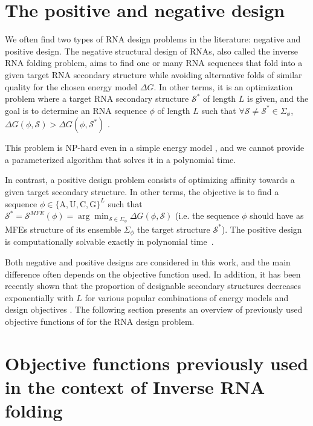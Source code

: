 \section{The positive and negative design}

We often find two types of \ac{RNA} design problems in the literature: negative and positive design. The negative structural design of \acp{RNA}, also called the inverse \ac{RNA} folding problem, aims to find one or many \ac{RNA} sequences that fold into a given target \ac{RNA} secondary structure while avoiding alternative folds of similar quality for the chosen energy model $\Delta G$. In other terms, it is an optimization problem where a target \ac{RNA} secondary structure $\mathcal{S}^*$ of length $L$ is given, and the goal is to determine an \ac{RNA} sequence $\phi$ of length $L$ such that $\forall \mathcal{S} \neq \mathcal{S}^* \in \Sigma_{\phi}$, $\Delta G(\phi, \mathcal{S}) > \Delta G(\phi, \mathcal{S}^*)$ .

This problem is \ac{NP}-hard even in a simple energy model \cite{bonnet2020designing}, and we cannot provide a parameterized algorithm that solves it in a polynomial time. 

In contrast, a positive design problem consists of optimizing affinity towards a given target secondary structure. In other terms, the objective is to find a sequence $\phi \in \{\text{A},\text{U},\text{C},\text{G}\}^L$ such that  $ \mathcal{S}^*=\mathcal{S}^{MFE}(\phi) = \arg \min_{\mathcal{S} \in \Sigma_{\phi}} \Delta G(\phi, \mathcal{S})$ (i.e. the sequence $\phi$ should have as \acp{MFE} structure of its ensemble $\Sigma_{\phi}$ the target structure $\mathcal{S}^*$). The positive design is computationally solvable exactly in polynomial time \cite{flamm2001design}. 

Both negative and positive designs are considered in this work, and the main difference often depends on the objective function used. In addition, it has been recently shown that the proportion of designable secondary structures decreases exponentially with $L$ for various popular combinations of energy models and design objectives \cite{yao2019exponentially}. The following section presents an overview of previously used objective functions of for the \ac{RNA} design problem.


\section{Objective functions previously used in the context of Inverse RNA folding}


